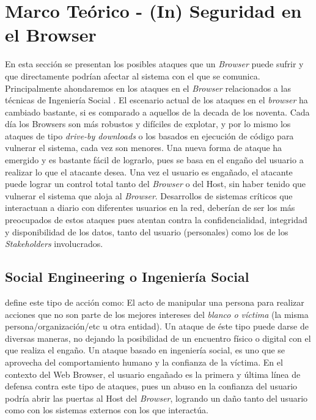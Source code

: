 \chapter{Marco Teórico - (In) Seguridad en el Browser}
\label{chap3:MT}

En esta sección se presentan los posibles ataques que un \textit{Browser} puede sufrir y que directamente podrían afectar al sistema con el que se comunica. Principalmente ahondaremos en los ataques en el \textit{Browser} relacionados a las técnicas de Ingeniería Social \cite{socEngineeering}. El escenario actual de los ataques en el \textit{browser} ha cambiado bastante, si es comparado a aquellos de la decada de los noventa. Cada día los Browsers son más robustos y difíciles de explotar, y por lo mismo los ataques de tipo \textit{drive-by downloads} o los basados en ejecución de código para vulnerar el sistema, cada vez son menores. Una nueva forma de ataque ha emergido y es bastante fácil de lograrlo, pues se basa en el engaño del usuario a realizar lo que el atacante desea. Una vez el usuario es engañado, el atacante puede lograr un control total tanto del \textit{Browser} o del Host, sin haber tenido que vulnerar el sistema \cite{Rajab2013,Labs2013} que aloja al \textit{Browser}. Desarrollos de sistemas críticos que interactuan a diario con diferentes usuarios en la red, deberían de ser los más preocupados de estos ataques pues atentan contra la confidencialidad, integridad y disponibilidad de los datos, tanto del usuario (personales) como los de los \textit{Stakeholders} involucrados.

\section{Social Engineering o Ingeniería Social}
\cite{socEngineeering} define este tipo de acción como: El acto de manipular una persona para realizar acciones que no son parte de los mejores intereses del \textit{blanco o víctima} (la misma persona/organización/etc u otra entidad). Un ataque de éste tipo puede darse de diversas maneras, no dejando la posibilidad de un encuentro físico o digital con el que realiza el engaño. Un ataque basado en ingeniería social, es uno que se aprovecha del comportamiento humano y la confianza de la víctima. En el contexto del Web Browser, el usuario engañado es la primera y última línea de defensa contra este tipo de ataques, pues un abuso en la confianza del usuario podría abrir las puertas al Host del \textit{Browser}, logrando un daño tanto del usuario como con los sistemas externos con los que interactúa.

